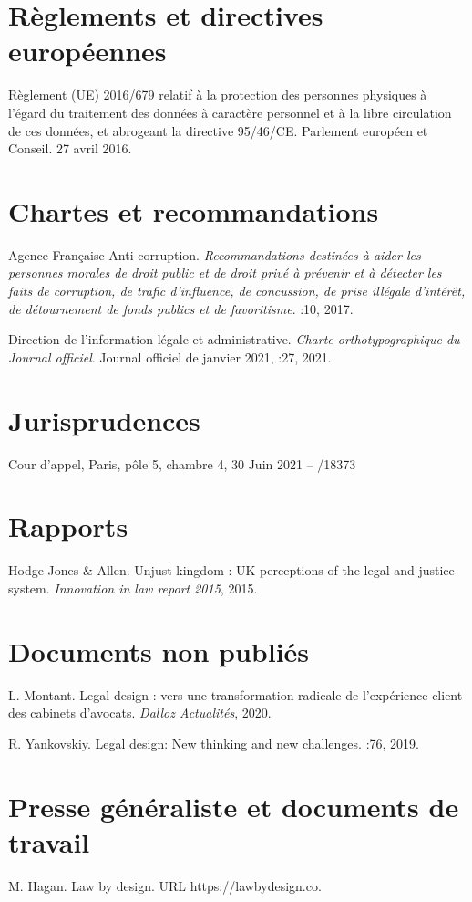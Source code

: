\section*{Règlements et directives européennes}
Règlement (UE) 2016/679 relatif à la protection des personnes physiques à l’égard du traitement des données à caractère personnel et à la libre circulation de ces données, et abrogeant la directive 95/46/CE. Parlement européen et Conseil. 27 avril 2016.\par{}

\section*{Chartes et recommandations}

Agence Française Anti-corruption. \emph{Recommandations destinées à aider les personnes morales de droit public et de droit privé à prévenir et à détecter les faits de corruption, de trafic d'influence, de concussion, de prise illégale d'intérêt, de détournement de fonds publics et de favoritisme}. :10, 2017.\par{}

Direction de l'information légale et administrative. \emph{Charte orthotypographique du Journal officiel}. Journal officiel de janvier 2021,  :27, 2021.\par{}

\section*{Jurisprudences}
Cour d'appel, Paris, pôle 5, chambre 4, 30 Juin 2021 – /18373\par{}

\section*{Rapports}
Hodge Jones \& Allen. Unjust kingdom : UK perceptions of the legal and justice system. \emph{Innovation in law report 2015}, 2015.\par{}

\section*{Documents non publiés}

L. Montant. Legal design : vers une transformation radicale de l’expérience client des cabinets d’avocats. \emph{Dalloz Actualités}, 2020.\par{}

R. Yankovskiy. Legal design: New thinking and new challenges. :76, 2019.

\section*{Presse généraliste et documents de travail}

M. Hagan. Law by design. URL https://lawbydesign.co.\par{}

\newpage